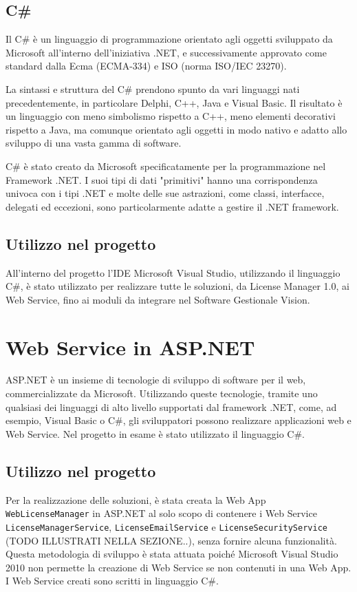 \subsection{C\#}
Il C\# è un linguaggio di programmazione orientato agli oggetti sviluppato da Microsoft all'interno dell'iniziativa .NET, e successivamente approvato come standard dalla Ecma (ECMA-334) e ISO (norma ISO/IEC 23270).

La sintassi e struttura del C\# prendono spunto da vari linguaggi nati precedentemente, in particolare Delphi, C++, Java e Visual Basic. Il risultato è un linguaggio con meno simbolismo rispetto a C++, meno elementi decorativi rispetto a Java, ma comunque orientato agli oggetti in modo nativo e adatto allo sviluppo di una vasta gamma di software.

C\# è stato creato da Microsoft specificatamente per la programmazione nel Framework .NET. I suoi tipi di dati "primitivi" hanno una corrispondenza univoca con i tipi .NET e molte delle sue astrazioni, come classi, interfacce, delegati ed eccezioni, sono particolarmente adatte a gestire il .NET framework.


\subsection{Utilizzo nel progetto}

All'interno del progetto l'IDE Microsoft Visual Studio, utilizzando il linguaggio C\#, è stato utilizzato per realizzare tutte le soluzioni, da License Manager 1.0, ai Web Service, fino ai moduli da integrare nel Software Gestionale Vision. 

\section{Web Service in ASP.NET}

ASP.NET è un insieme di tecnologie di sviluppo di software per il web, commercializzate da Microsoft. Utilizzando queste tecnologie, tramite uno qualsiasi dei linguaggi di alto livello supportati dal framework .NET, come, ad esempio, Visual Basic o C\#, gli sviluppatori possono realizzare applicazioni web e Web Service.
Nel progetto in esame è stato utilizzato il linguaggio C\#{}.

\subsection{Utilizzo nel progetto}

Per la realizzazione delle soluzioni, è stata creata la Web App \texttt{WebLicenseManager} in ASP.NET al solo scopo di contenere i Web Service \texttt{LicenseManagerService}, \texttt{LicenseEmailService} e \texttt{LicenseSecurityService} (TODO ILLUSTRATI NELLA SEZIONE..), senza fornire alcuna funzionalità. Questa metodologia di sviluppo è stata attuata poiché Microsoft Visual Studio 2010 non permette la creazione di Web Service se non contenuti in una Web App.\\
I Web Service creati sono scritti in linguaggio C\#.

